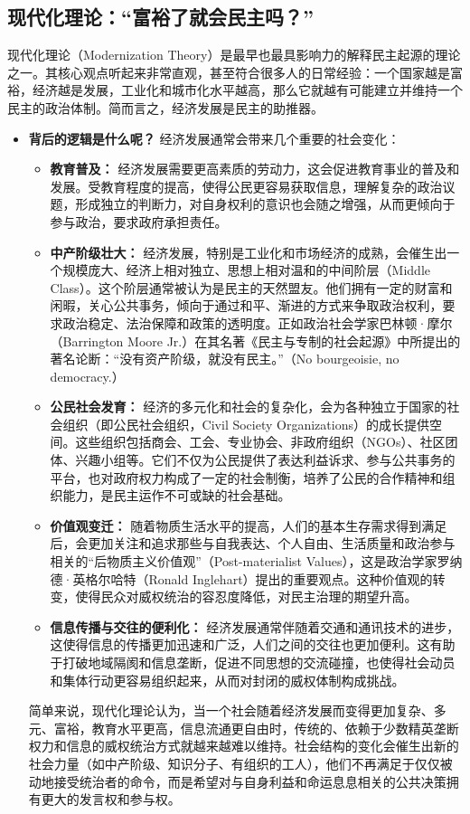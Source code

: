 \documentclass[UTF8, 10pt]{ctexbook}
\begin{document}
\subsection{现代化理论：“富裕了就会民主吗？”}
现代化理论（Modernization Theory）是最早也最具影响力的解释民主起源的理论之一。其核心观点听起来非常直观，甚至符合很多人的日常经验：一个国家越是富裕，经济越是发展，工业化和城市化水平越高，那么它就越有可能建立并维持一个民主的政治体制。简而言之，经济发展是民主的助推器。
\begin{itemize}
    \item \textbf{背后的逻辑是什么呢？} 经济发展通常会带来几个重要的社会变化：
    \begin{itemize}
        \item \textbf{教育普及：} 经济发展需要更高素质的劳动力，这会促进教育事业的普及和发展。受教育程度的提高，使得公民更容易获取信息，理解复杂的政治议题，形成独立的判断力，对自身权利的意识也会随之增强，从而更倾向于参与政治，要求政府承担责任。
        \item \textbf{中产阶级壮大：} 经济发展，特别是工业化和市场经济的成熟，会催生出一个规模庞大、经济上相对独立、思想上相对温和的中间阶层（Middle Class）。这个阶层通常被认为是民主的天然盟友。他们拥有一定的财富和闲暇，关心公共事务，倾向于通过和平、渐进的方式来争取政治权利，要求政治稳定、法治保障和政策的透明度。正如政治社会学家巴林顿·摩尔（Barrington Moore Jr.）在其名著《民主与专制的社会起源》中所提出的著名论断：“没有资产阶级，就没有民主。”（No bourgeoisie, no democracy.）
        \item \textbf{公民社会发育：} 经济的多元化和社会的复杂化，会为各种独立于国家的社会组织（即公民社会组织，Civil Society Organizations）的成长提供空间。这些组织包括商会、工会、专业协会、非政府组织（NGOs）、社区团体、兴趣小组等。它们不仅为公民提供了表达利益诉求、参与公共事务的平台，也对政府权力构成了一定的社会制衡，培养了公民的合作精神和组织能力，是民主运作不可或缺的社会基础。
        \item \textbf{价值观变迁：} 随着物质生活水平的提高，人们的基本生存需求得到满足后，会更加关注和追求那些与自我表达、个人自由、生活质量和政治参与相关的“后物质主义价值观”（Post-materialist Values），这是政治学家罗纳德·英格尔哈特（Ronald Inglehart）提出的重要观点。这种价值观的转变，使得民众对威权统治的容忍度降低，对民主治理的期望升高。
        \item \textbf{信息传播与交往的便利化：} 经济发展通常伴随着交通和通讯技术的进步，这使得信息的传播更加迅速和广泛，人们之间的交往也更加便利。这有助于打破地域隔阂和信息垄断，促进不同思想的交流碰撞，也使得社会动员和集体行动更容易组织起来，从而对封闭的威权体制构成挑战。
    \end{itemize}
    简单来说，现代化理论认为，当一个社会随着经济发展而变得更加复杂、多元、富裕，教育水平更高，信息流通更自由时，传统的、依赖于少数精英垄断权力和信息的威权统治方式就越来越难以维持。社会结构的变化会催生出新的社会力量（如中产阶级、知识分子、有组织的工人），他们不再满足于仅仅被动地接受统治者的命令，而是希望对与自身利益和命运息息相关的公共决策拥有更大的发言权和参与权。


\end{itemize}
\end{document}

